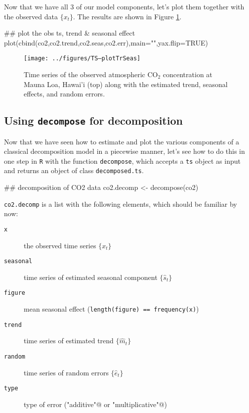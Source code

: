 Now that we have all 3 of our model components, let's plot them together with the observed data $\{x_t\}$.  The results are shown in Figure \ref{fig:LW1.figALL}.

\begin{Schunk}
\begin{Sinput}
 ## plot the obs ts, trend & seasonal effect
 plot(cbind(co2,co2.trend,co2.seas,co2.err),main="",yax.flip=TRUE)
\end{Sinput}
\end{Schunk}

\begin{figure}[htp]
\begin{center}
\texttt{[image: ../figures/TS--plotTrSeas]}
\end{center}
\caption{Time series of the observed atmospheric CO$_2$ concentration at Mauna Loa, Hawai'i (top) along with the estimated trend, seasonal effects, and random errors.}
\label{fig:LW1.figALL}
\end{figure}

\subsection{Using \texttt{decompose} for decomposition}

Now that we have seen how to estimate and plot the various components of a classical decomposition model in a piecewise manner, let's see how to do this in one step in \texttt{R} with the function \texttt{decompose}, which accepts a \texttt{ts} object as input and returns an object of class \texttt{decomposed.ts}.

\begin{Schunk}
\begin{Sinput}
 ## decomposition of CO2 data
 co2.decomp <- decompose(co2)
\end{Sinput}
\end{Schunk}

\noindent \texttt{co2.decomp} is a list with the following elements, which should be familiar by now:

\begin{description}
  \item[   \texttt{x} ] the observed time series $\{x_t\}$
  \item[   \texttt{seasonal} ] time series of estimated seasonal component $\{\hat{s}_t\}$
  \item[   \texttt{figure} ] mean seasonal effect (\texttt{length(figure) == frequency(x)})
  \item[   \texttt{trend} ] time series of estimated trend $\{\hat{m}_t\}$
  \item[   \texttt{random} ] time series of random errors $\{\hat{e}_t\}$
  \item[   \texttt{type} ] type of error (\verb@"additive"@ or \verb@"multiplicative"@)
\end{description}

